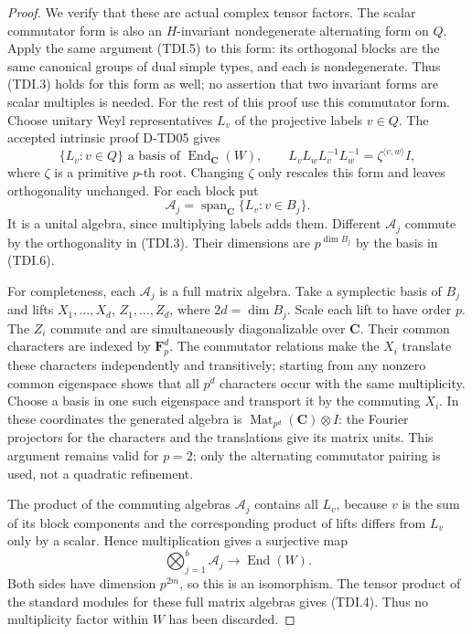 \begin{proof}
We verify that these are actual complex tensor factors. The scalar
commutator form is also an \(H\)-invariant nondegenerate alternating
form on \(Q\). Apply the same argument (TDI.5) to this form: its
orthogonal blocks are the same canonical groups of dual simple types,
and each is nondegenerate. Thus (TDI.3) holds for this form as well;
no assertion that two invariant forms are scalar multiples is needed.
For the rest of this proof use this commutator form. Choose unitary
Weyl representatives \(L_v\) of the projective labels \(v\in Q\).
The accepted intrinsic proof D-TD05 gives
\[
 \{L_v:v\in Q\}\text{ a basis of }\operatorname{End}_{\mathbf C}(W),
 \qquad
 L_vL_wL_v^{-1}L_w^{-1}
                   =\zeta^{\langle v,w\rangle}I,
 \tag{TDI.6}
\]
where \(\zeta\) is a primitive \(p\)-th root. Changing \(\zeta\)
only rescales this form and leaves orthogonality unchanged.
For each block put
\[
             \mathcal A_j=\operatorname{span}_{\mathbf C}
                                  \{L_v:v\in B_j\}.
 \tag{TDI.7}
\]
It is a unital algebra, since multiplying labels adds them.
Different \(\mathcal A_j\) commute by the orthogonality in (TDI.3).
Their dimensions are \(p^{\dim B_j}\) by the basis in (TDI.6).

For completeness, each \(\mathcal A_j\) is a full matrix algebra.
Take a symplectic basis of \(B_j\) and lifts \(X_1,\ldots,X_d\),
\(Z_1,\ldots,Z_d\), where \(2d=\dim B_j\). Scale each lift to
have order \(p\). The \(Z_i\) commute and are simultaneously
diagonalizable over \(\mathbf C\). Their common characters are
indexed by \(\mathbf F_p^d\). The commutator relations make the
\(X_i\) translate these characters independently and transitively;
starting from any nonzero common eigenspace shows that all \(p^d\)
characters occur with the same multiplicity. Choose a basis in one
such eigenspace and transport it by the commuting \(X_i\).
In these coordinates the generated algebra is
\(\operatorname{Mat}_{p^d}(\mathbf C)\otimes I\): the Fourier
projectors for the characters and the translations give its matrix
units. This argument remains valid for \(p=2\); only the alternating
commutator pairing is used, not a quadratic refinement.

The product of the commuting algebras \(\mathcal A_j\) contains
all \(L_v\), because \(v\) is the sum of its block components
and the corresponding product of lifts differs from \(L_v\)
only by a scalar. Hence multiplication gives a surjective map
\[
          \bigotimes_{j=1}^b\mathcal A_j
                       \longrightarrow\operatorname{End}(W).
 \tag{TDI.8}
\]
Both sides have dimension \(p^{2m}\), so this is an isomorphism.
The tensor product of the standard modules for these full matrix
algebras gives (TDI.4). Thus no multiplicity factor within \(W\)
has been discarded.


\end{proof}

